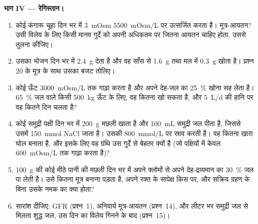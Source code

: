 \begin{problem}
\medskip
\noindent\textbf{भाग IV --- रेगिस्तान।}
\begin{enumerate}[resume]
  \item कोई कंगारू चूहा दिन भर में \qty{3}{mOsm} \qty{5500}{mOsm/L} पर
        उत्सर्जित करता है। मूत्र-आयतन? उसी विलेय के लिए किसी मानव
        गुर्दे को अपनी अधिकतम पर जितना आयतन चाहिए होता, उससे तुलना
        कीजिए।
  \item उसका भोजन दिन भर में \qty{2.4}{g}  देता है और वह
        साँस से \qty{1.6}{g} तथा मल में \qty{0.3}{g} खोता है। प्रश्न 20
        के मूत्र के साथ उसका बजट तोलिए।
  \item कोई ऊँट \qty{3000}{mOsm/L} तक गाढ़ा करता है और अपने देह-जल का
        \qty{25}{\%} खोना सह लेता है। \qty{65}{\%} जल वाले किसी
        \qty{500}{kg} ऊँट के लिए, वह कितना खो सकता है, और
        \qty{5}{L/d} की हानि पर वह कितने दिन चलता है?
  \item कोई समुद्री पक्षी दिन भर में \qty{200}{g} मछली खाता है और
        \qty{100}{mL} समुद्री जल पीता है, जिससे उसमें \qty{150}{mmol}
        NaCl जाता है। उसकी  \qty{800}{mmol/L} पर स्राव करती
        है। वह कितना खारा घोल बनाता है, और इसके लिए वह ग्रंथि उस
        गुर्दे से बेहतर क्यों है (जो पक्षियों में केवल \qty{600}{mOsm/L}
        तक गाढ़ा करता है)?
  \item \qty{100}{g} की कोई मीठे पानी की मछली दिन भर में अपने क्लोमों
        से अपने देह-द्रव्यमान का \qty{30}{\%} जल पा लेती है। उसे कितना
        मूत्र बनाना पड़ता है, अपने रक्त के सापेक्ष किस  पर,
        और सक्रिय ग्रहण के बिना उसके नमक का क्या होता?
  \item सारांश दीजिए: GFR (प्रश्न~1), अनिवार्य मूत्र-आयतन (प्रश्न~14),
        और लीटर भर समुद्री जल से मिलता शुद्ध जल, उस दिन का विलेय गिनने
        के बाद (प्रश्न~15)।
\end{enumerate}
\end{problem}
